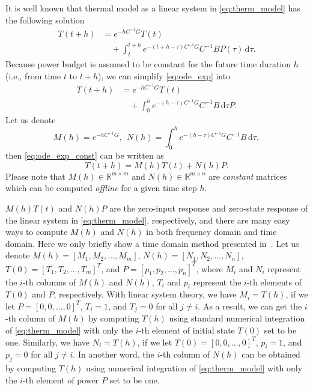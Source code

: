 It is well known that thermal model as a linear system in \eqref{eq:therm_model} has the following solution
\begin{equation}\label{eq:ode_exp}
\begin{split}
T(t+h) &= e^{-hC^{-1}G}T(t)\\
& \quad +\int_{t}^{t+h} \! e^{-(t+h-\tau)C^{-1}G}C^{-1}BP(\tau) \, \mathrm{d}\tau.
\end{split}
\end{equation}
Because power budget is assumed to be constant for the future time
duration $h$ (i.e., from time $t$ to $t+h$), we can simplify
\eqref{eq:ode_exp} into
\begin{equation}\label{eq:ode_exp_const}
\begin{split}
T(t+h) &= e^{-hC^{-1}G}T(t)\\
& \quad +\int_{0}^{h} \! e^{-(h-\tau)C^{-1}G}C^{-1}B \, \mathrm{d}\tau P.
\end{split}
\end{equation}
Let us denote 
\begin{equation*}
M(h)=e^{-hC^{-1}G}, ~~N(h)=\int_{0}^{h} \! e^{-(h-\tau)C^{-1}G}C^{-1}B \, \mathrm{d}\tau,
\end{equation*}
then \eqref{eq:ode_exp_const} can be written as
\begin{equation}\label{eq:ode_exp_h}
T(t+h) =M(h)T(t)+N(h)P.
\end{equation}
Please note that $M(h) \in \mathbb{R}^{m\times m}$ and $N(h) \in
\mathbb{R}^{m \times n}$ are \emph{constant} matrices which
can be computed \emph{offline} for a given time step $h$. 

$M(h)T(t)$ and $N(h)P$ are the zero-input response and zero-state response of the
linear system in \eqref{eq:therm_model}, respectively, and there are many
easy ways to compute $M(h)$ and $N(h)$ in both frequency domain and
time domain. Here we only briefly show a time domain method presented
in~\cite{Han:JLPE'07}. 
Let us denote $M(h)=[M_1, M_2, \ldots, M_m]$, $N(h)=[N_1, N_2, \ldots, N_n]$,
$T(0)=[T_1, T_2, \ldots, T_m]^T$, and $P=[p_1, p_2, \ldots, p_n]^T$,
where $M_i$ and $N_i$ represent the $i$-th columns of $M(h)$ and $N(h)$,
$T_i$ and $p_i$ represent the $i$-th elements of $T(0)$ and $P$,
respectively. With linear system theory, we have $M_i=T(h)$, if we let $P=[0,0,\ldots,0]^{T}$, $T_i=1$, and
$T_j=0$ for all $j\neq i$. As a result, we can get the $i$-th column of
$M(h)$ by computing $T(h)$ using standard numerical integration of \eqref{eq:therm_model} with only the $i$-th
element of initial state $T(0)$ set to be one. Similarly, we have
$N_i=T(h)$, if we let $T(0)=[0,0,\ldots,0]^T$, $p_i=1$, and $p_j=0$ for all $j\neq
i$. In another word, the $i$-th column of
$N(h)$ can be obtained by computing $T(h)$ using numerical integration of
\eqref{eq:therm_model} with only the $i$-th
element of power $P$ set to be one.

